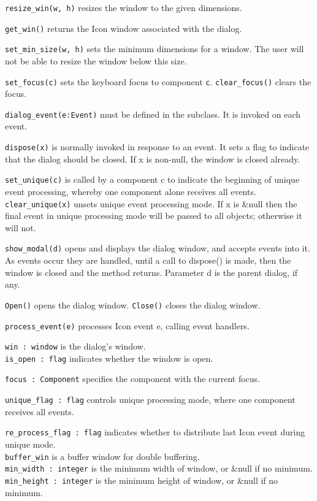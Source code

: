 \noindent\texttt{resize\_win(w, h)} resizes the window to the given dimensions.

\noindent\texttt{get\_win()} returns the Icon window associated with the dialog.

\noindent\texttt{set\_min\_size(w, h)} sets the minimum dimensions for a window. The user
will not be able to resize the window below this size.

\noindent\texttt{set\_focus(c)} sets the keyboard focus to component \texttt{c}.
\texttt{clear\_focus()} clears the focus.

\noindent\texttt{dialog\_event(e:Event)} must be defined in the subclass. It is
invoked on each event.

\noindent\texttt{dispose(x)} is normally invoked in response to an event.
It sets a
flag to indicate that the dialog should be closed. If x is non-null,
the window is closed already.

\noindent\texttt{set\_unique(c)} is called by a component c to indicate the beginning of
unique event processing, whereby one component alone receives all
events.\\
\texttt{clear\_unique(x)} unsets unique event processing mode. If x is \&null
then the final event in unique processing mode will be passed to all
objects; otherwise it will not.

\texttt{show\_modal(d)} opens and displays the dialog window, and accepts events
into it. As events occur they are handled, until a call to dispose()
is made, then the window is closed and the method returns. Parameter d
is the parent dialog, if any.

\texttt{Open()} opens the dialog window.
\texttt{Close()} closes the dialog window.

\texttt{process\_event(e)} processes Icon event e, calling event handlers.

\texttt{win : window} is the dialog's window.\\
\texttt{is\_open : flag} indicates whether the window is open.

\texttt{focus : Component} specifies the component with the current focus.

\texttt{unique\_flag : flag} controls unique processing mode, where one
component receives all events.

\texttt{re\_process\_flag : flag} indicates whether to distribute last
Icon event during unique mode.\\
\texttt{buffer\_win} is a buffer window for double buffering.\\
\texttt{min\_width : integer} is the minimum width of window, or \&null if no
minimum.\\
\texttt{min\_height : integer} is the minimum height of window, or \&null if no
minimum.


